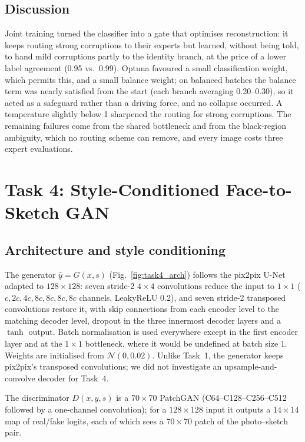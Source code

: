 \documentclass[conference]{IEEEtran}
\begin{document}
\subsection{Discussion}
Joint training turned the classifier into a gate that optimises
reconstruction: it keeps routing strong corruptions to their experts but
learned, without being told, to hand mild corruptions partly to the identity
branch, at the price of a lower label agreement (0.95 vs.\ 0.99). Optuna
favoured a small classification weight, which permits this, and a small
balance weight; on balanced batches the balance term was nearly satisfied
from the start (each branch averaging 0.20--0.30), so it acted as a safeguard
rather than a driving force, and no collapse occurred. A temperature slightly
below 1 sharpened the routing for strong corruptions. The remaining failures
come from the shared bottleneck and from the black-region ambiguity, which no
routing scheme can remove, and every image costs three expert evaluations.

\section{Task 4: Style-Conditioned Face-to-Sketch GAN}
\label{sec:task4}

\subsection{Architecture and style conditioning}
The generator $\hat{y}=G(x,s)$ (Fig.~\ref{fig:task4_arch}) follows the
pix2pix U-Net~\cite{isola2017image,ronneberger2015unet} adapted to
$128\times128$: seven stride-2 $4\times4$ convolutions reduce the input to
$1\times1$ ($c, 2c, 4c, 8c, 8c, 8c, 8c$ channels, LeakyReLU 0.2), and seven
stride-2 transposed convolutions restore it, with skip connections from each
encoder level to the matching decoder level, dropout in the three innermost
decoder layers and a $\tanh$ output. Batch normalisation is used everywhere
except in the first encoder layer and at the $1\times1$ bottleneck, where it
would be undefined at batch size 1. Weights are initialised from
$\mathcal{N}(0,0.02)$. Unlike Task~1, the generator keeps pix2pix's
transposed convolutions; we did not investigate an upsample-and-convolve
decoder for Task~4.

The discriminator $D(x,y,s)$ is a $70\times70$ PatchGAN
(C64--C128--C256--C512 followed by a one-channel convolution); for a
$128\times128$ input it outputs a $14\times14$ map of real/fake logits, each
of which sees a $70\times70$ patch of the photo--sketch pair.
\end{document}

